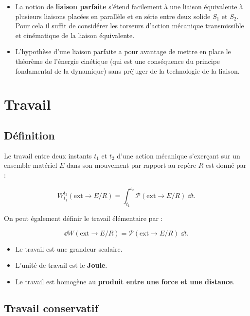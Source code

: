 \documentclass[10pt,fleqn]{article} %
\begin{document}
\begin{rem}%
\begin{itemize}
\item La notion de \textbf{liaison parfaite} s'étend facilement à une liaison équivalente à plusieurs liaisons placées en parallèle et en série entre deux solide $S_1$ et $S_2$. Pour cela il suffit de considérer les torseurs d'action mécanique transmissible et cinématique de la liaison équivalente.
\item L'hypothèse d'une liaison parfaite a pour avantage de mettre en place le théorème de l'énergie cinétique (qui est une conséquence du principe fondamental de la dynamique) sans préjuger de la technologie de la liaison.
\end{itemize}
\end{rem}%


\section{Travail}
\subsection{Définition}
\begin{defi}[Travail]
Le travail entre deux instants $t_1$ et $t_2$ d'une action mécanique s'exerçant sur un ensemble matériel $E$ dans son mouvement par rapport au repère $R$ est donné par :

$$
\displaystyle{W^{t_2}_{t_1}}(\text{ext} \rightarrow E/R)=\displaystyle{\int_{t_1}^{t_2}}\mathcal{P}(\text{ext} \rightarrow E/R)\;\dd t.
$$
\end{defi}

\begin{rem}%
On peut également définir le travail élémentaire par :

$$\dd W(\text{ext} \rightarrow E/R)=\mathcal{P}(\text{ext} \rightarrow E/R)\;\dd t.
$$

\begin{itemize}
\item Le travail est une grandeur scalaire.
\item L'unité de travail est le \textbf{Joule}.
\item Le travail est homogène au \textbf{produit entre une force et une distance}.
\end{itemize}

\end{rem}%



\subsection{Travail conservatif}
\end{document}
